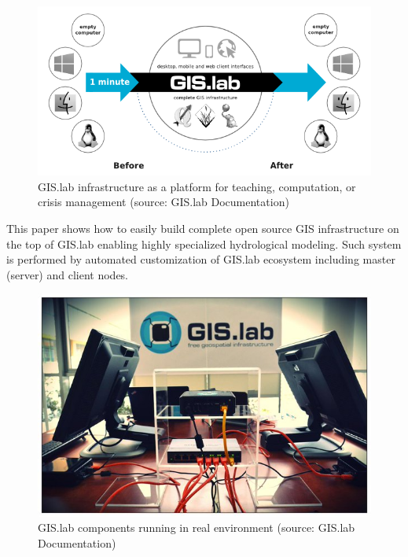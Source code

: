 \documentclass{isprs}
\begin{document}
\begin{figure}[ht!]
\begin{center}
  \includegraphics[width=1.0\columnwidth]{figures/gislab-architecture.png}
  \caption{GIS.lab infrastructure as a platform for teaching,
    computation, or crisis management (source: GIS.lab Documentation)}
\label{fig:gislab_infrastructure}
\end{center}
\end{figure}

This paper shows how to easily build complete open source GIS
infrastructure on the top of GIS.lab enabling highly specialized
hydrological modeling. Such system is performed by automated
customization of GIS.lab ecosystem including master (server) and
client nodes.

\begin{figure}[ht!]
\begin{center}
  \includegraphics[width=0.9\columnwidth]{figures/gislab-real.jpg}
  \caption{GIS.lab components running in real environment (source:
    GIS.lab Documentation)}
\label{fig:gislab_infrastructure}
\end{center}
\end{figure}
\end{document}
